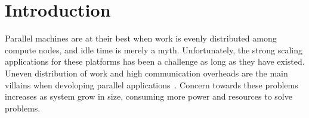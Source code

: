 \section{Introduction}


%
%
%
%
%
%
%
%
%

Parallel machines are at their best when work is evenly distributed among compute nodes, and idle time is merely a myth.
Unfortunately, the strong scaling applications for these platforms has been a challenge as long as they have existed.
Uneven distribution of work and high communication overheads are the main villains when devoloping parallel applications~\cite{Deveci2015, commaware}.
Concern towards these problems increases as system grow in size, consuming more power and resources to solve problems.

